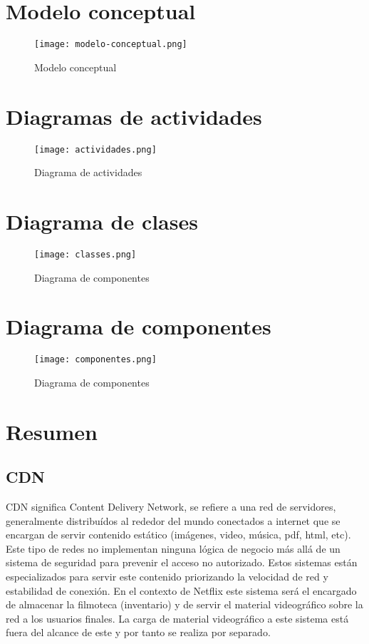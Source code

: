 \documentclass{article}
\begin{document}
\section{Modelo conceptual}
\begin{figure}[h]
	\centering
        \texttt{[image: modelo-conceptual.png]}
                 \caption{Modelo conceptual}
\end{figure}	

\clearpage
\section{Diagramas de actividades}
\begin{figure}[h]
	\centering
        \texttt{[image: actividades.png]}
                 \caption{Diagrama de actividades}
\end{figure}	

\clearpage
\section{Diagrama de clases}
\begin{figure}[h]
	\centering
        \texttt{[image: classes.png]}
                 \caption{Diagrama de componentes}
\end{figure}	

\clearpage
\section{Diagrama de componentes}
\begin{figure}[h]
	\centering
        \texttt{[image: componentes.png]}
                 \caption{Diagrama de componentes}
\end{figure}	

\section{Resumen}
\subsection{CDN}
CDN significa Content Delivery Network, se refiere a una red 
de servidores, generalmente distribuídos al rededor del mundo
conectados  a internet que se encargan de servir contenido
estático (imágenes, video, música, pdf, html, etc). Este tipo
de redes no implementan ninguna lógica de negocio más allá de un
sistema de seguridad para prevenir el acceso no autorizado.
Estos sistemas están especializados para servir este 
contenido priorizando la velocidad de red y estabilidad de conexión.
En el contexto de Netflix este sistema será el encargado de almacenar
la filmoteca (inventario) y de servir el material videográfico 
sobre la red a los usuarios finales. 
La carga de material videográfico a este sistema está 
fuera del alcance de este y por tanto se realiza por separado.
\end{document}
